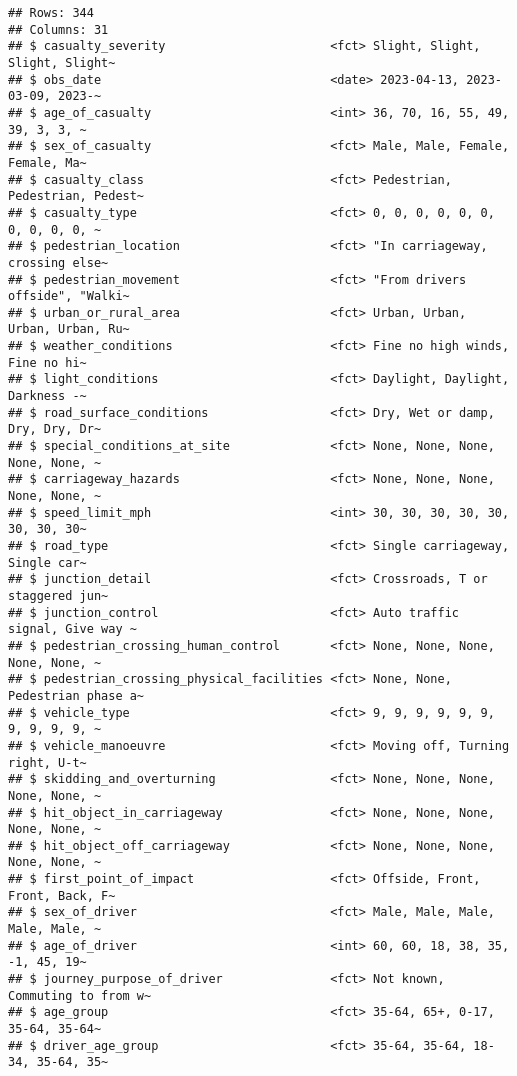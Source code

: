 \documentclass[
]{article}
\begin{document}
\begin{verbatim}
## Rows: 344
## Columns: 31
## $ casualty_severity                       <fct> Slight, Slight, Slight, Slight~
## $ obs_date                                <date> 2023-04-13, 2023-03-09, 2023-~
## $ age_of_casualty                         <int> 36, 70, 16, 55, 49, 39, 3, 3, ~
## $ sex_of_casualty                         <fct> Male, Male, Female, Female, Ma~
## $ casualty_class                          <fct> Pedestrian, Pedestrian, Pedest~
## $ casualty_type                           <fct> 0, 0, 0, 0, 0, 0, 0, 0, 0, 0, ~
## $ pedestrian_location                     <fct> "In carriageway, crossing else~
## $ pedestrian_movement                     <fct> "From drivers offside", "Walki~
## $ urban_or_rural_area                     <fct> Urban, Urban, Urban, Urban, Ru~
## $ weather_conditions                      <fct> Fine no high winds, Fine no hi~
## $ light_conditions                        <fct> Daylight, Daylight, Darkness -~
## $ road_surface_conditions                 <fct> Dry, Wet or damp, Dry, Dry, Dr~
## $ special_conditions_at_site              <fct> None, None, None, None, None, ~
## $ carriageway_hazards                     <fct> None, None, None, None, None, ~
## $ speed_limit_mph                         <int> 30, 30, 30, 30, 30, 30, 30, 30~
## $ road_type                               <fct> Single carriageway, Single car~
## $ junction_detail                         <fct> Crossroads, T or staggered jun~
## $ junction_control                        <fct> Auto traffic signal, Give way ~
## $ pedestrian_crossing_human_control       <fct> None, None, None, None, None, ~
## $ pedestrian_crossing_physical_facilities <fct> None, None, Pedestrian phase a~
## $ vehicle_type                            <fct> 9, 9, 9, 9, 9, 9, 9, 9, 9, 9, ~
## $ vehicle_manoeuvre                       <fct> Moving off, Turning right, U-t~
## $ skidding_and_overturning                <fct> None, None, None, None, None, ~
## $ hit_object_in_carriageway               <fct> None, None, None, None, None, ~
## $ hit_object_off_carriageway              <fct> None, None, None, None, None, ~
## $ first_point_of_impact                   <fct> Offside, Front, Front, Back, F~
## $ sex_of_driver                           <fct> Male, Male, Male, Male, Male, ~
## $ age_of_driver                           <int> 60, 60, 18, 38, 35, -1, 45, 19~
## $ journey_purpose_of_driver               <fct> Not known, Commuting to from w~
## $ age_group                               <fct> 35-64, 65+, 0-17, 35-64, 35-64~
## $ driver_age_group                        <fct> 35-64, 35-64, 18-34, 35-64, 35~
\end{verbatim}
\end{document}
